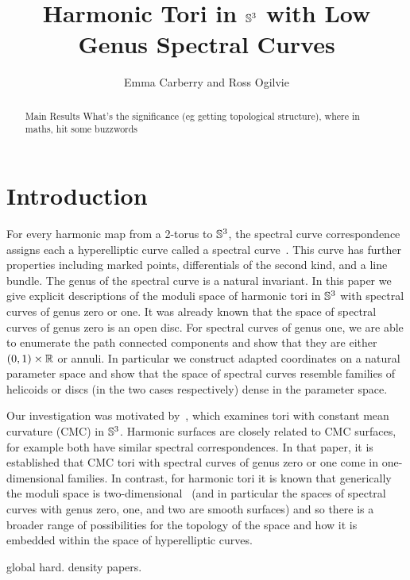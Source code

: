 \documentclass{article}
\begin{document}
\title{Harmonic Tori in $\S^3$ with Low Genus Spectral Curves}
\author{Emma Carberry and Ross Ogilvie}
\date{}
\maketitle

\begin{abstract}
Main Results
What's the significance (eg getting topological structure), where in maths, hit some buzzwords
\end{abstract}

\section{Introduction}\label{sec:Introduction}

For every harmonic map from a 2-torus to $\S^3$, the spectral curve correspondence assigns each a hyperelliptic curve called a spectral curve~\cite{Hitchin1990}. This curve has further properties including marked points, differentials of the second kind, and a line bundle. The genus of the spectral curve is a natural invariant.
In this paper we give explicit descriptions of the moduli space of harmonic tori in $\S^3$ with spectral curves of genus zero or one. 
It was already known that the space of spectral curves of genus zero is an open disc.
For spectral curves of genus one, we are able to enumerate the path connected components and show that they are either $(0,1)\times\R$ or annuli. In particular we construct adapted coordinates on a natural parameter space and show that the space of spectral curves resemble families of helicoids or discs (in the two cases respectively) dense in the parameter space.

Our investigation was motivated by~\cite{Kilian2015a}, which examines tori with constant mean curvature (CMC) in $\S^3$. Harmonic surfaces are closely related to CMC surfaces, for example both have similar spectral correspondences. In that paper, it is established that CMC tori with spectral curves of genus zero or one come in one-dimensional families.
In contrast, for harmonic tori it is known that generically the moduli space is two-dimensional~\cite{Carberry2019} (and in particular the spaces of spectral curves with genus zero, one, and two are smooth surfaces) and so there is a broader range of possibilities for the topology of the space and how it is embedded within the space of hyperelliptic curves.

global hard. density papers. \cite{Carberry2016a}\cite{Carberry2016}
\end{document}
